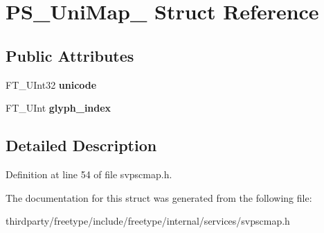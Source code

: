 \hypertarget{struct_p_s___uni_map__}{}\section{P\+S\+\_\+\+Uni\+Map\+\_\+ Struct Reference}
\label{struct_p_s___uni_map__}
\subsection*{Public Attributes}
\begin{DoxyCompactItemize}
\item 
\mbox{\label{struct_p_s___uni_map___a87c1f471eb4033fc5ed9d0f1ecaf35a1}} 
F\+T\+\_\+\+U\+Int32 {\bfseries unicode}
\item 
\mbox{\label{struct_p_s___uni_map___a0d5b2e3c405aeab1f1059a3587125cfd}} 
F\+T\+\_\+\+U\+Int {\bfseries glyph\+\_\+index}
\end{DoxyCompactItemize}


\subsection{Detailed Description}


Definition at line 54 of file svpscmap.\+h.



The documentation for this struct was generated from the following file\+:\begin{DoxyCompactItemize}
\item 
thirdparty/freetype/include/freetype/internal/services/svpscmap.\+h\end{DoxyCompactItemize}

